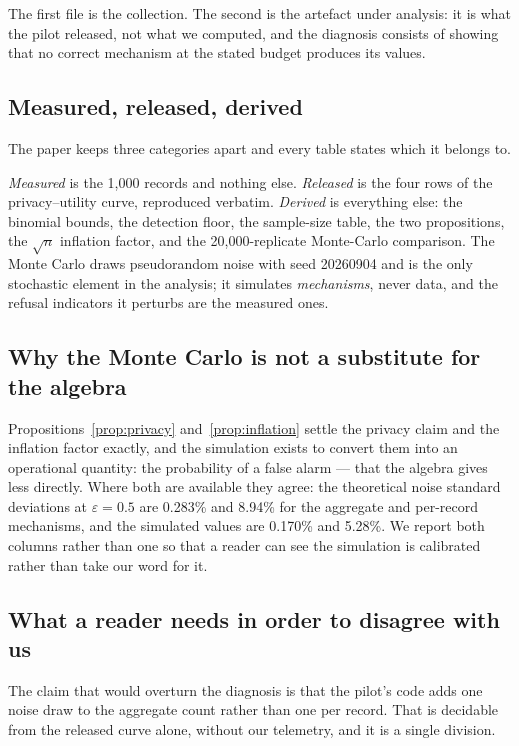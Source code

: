 \documentclass[journal]{IEEEtran}
\theoremstyle{definition}
\newcommand{\Trials}{20{,}000}
\newcommand{\Seed}{20260904}
\newcommand{\WorstEps}{0.5}
\newcommand{\LapSDhalf}{0.170}
\newcommand{\PerSDhalf}{5.28}
\newcommand{\LapSDtheoryhalf}{0.283}
\newcommand{\PerSDtheoryhalf}{8.94}
\newcommand{\TNtel}{1{,}000}
\begin{document}
The first file is the collection. The second is the artefact under analysis: it
is what the pilot released, not what we computed, and the diagnosis consists of
showing that no correct mechanism at the stated budget produces its values.

\subsection{Measured, released, derived}

The paper keeps three categories apart and every table states which it belongs
to.

\emph{Measured} is the \TNtel{} records and nothing else. \emph{Released} is the
four rows of the privacy--utility curve, reproduced verbatim. \emph{Derived} is
everything else: the binomial bounds, the detection floor, the sample-size
table, the two propositions, the $\sqrt{n}$ inflation factor, and the
\Trials-replicate Monte-Carlo comparison. The Monte Carlo draws pseudorandom
noise with seed \Seed{} and is the only stochastic element in the analysis; it
simulates \emph{mechanisms}, never data, and the refusal indicators it perturbs
are the measured ones.

\subsection{Why the Monte Carlo is not a substitute for the algebra}

Propositions~\ref{prop:privacy} and~\ref{prop:inflation} settle the privacy
claim and the inflation factor exactly, and the simulation exists to convert
them into an operational quantity: the probability of a false alarm --- that
the algebra gives less directly. Where both are available they agree: the
theoretical noise standard deviations at $\varepsilon=\WorstEps$ are
\LapSDtheoryhalf\% and \PerSDtheoryhalf\% for the aggregate and per-record
mechanisms, and the simulated values are \LapSDhalf\% and \PerSDhalf\%. We
report both columns rather than one so that a reader can see the simulation is
calibrated rather than take our word for it.

\subsection{What a reader needs in order to disagree with us}

The claim that would overturn the diagnosis is that the pilot's code adds one
noise draw to the aggregate count rather than one per record. That is decidable
from the released curve alone, without our telemetry, and it is a single division.
\end{document}
